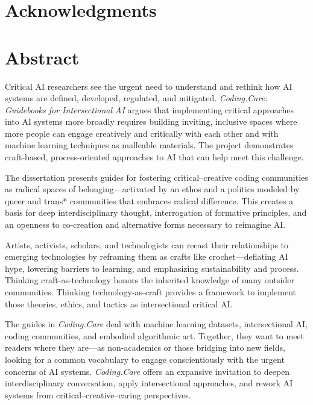 \documentclass[11pt,oneside]{scrbook} %
\begin{document}
\newpage
    \chapter*{Acknowledgments}
% 

\newpage
\renewcommand{\contentsname}{Table of Contents}
    \begin{singlespace}
      \tableofcontents
    \end{singlespace}

\newpage
    \listoffigures

\newpage
% 
\chapter*{Abstract}

Critical AI researchers see the urgent need to understand and rethink how AI systems are defined, developed, regulated, and mitigated. \emph{Coding.Care: Guidebooks for Intersectional AI} argues that implementing critical approaches into AI systems more broadly requires building inviting, inclusive spaces where more people can engage creatively and critically with each other and with machine learning techniques as malleable materials. The project demonstrates craft-based, process-oriented approaches to AI that can help meet this challenge. 

The dissertation presents guides for fostering critical–creative coding communities as radical spaces of belonging—activated by an ethos and a politics modeled by queer and trans* communities that embraces radical difference. This creates a basis for deep interdisciplinary thought, interrogation of formative principles, and an openness to co-creation and alternative forms necessary to reimagine AI. 

Artists, activists, scholars, and technologists can recast their relationships to emerging technologies by reframing them as crafts like crochet—deflating AI hype, lowering barriers to learning, and emphasizing sustainability and process. Thinking craft-as-technology honors the inherited knowledge of many outsider communities. Thinking technology-as-craft provides a framework to implement those theories, ethics, and tactics as intersectional critical AI. 

The guides in \emph{Coding.Care} deal with machine learning datasets, intersectional AI, coding communities, and embodied algorithmic art. Together, they want to meet readers where they are—as non-academics or those bridging into new fields, looking for a common vocabulary to engage conscientiously with the urgent concerns of AI systems. \emph{Coding.Care} offers an expansive invitation to deepen interdisciplinary conversation, apply intersectional approaches, and rework AI systems from critical–creative–caring perspectives.
\end{document}
